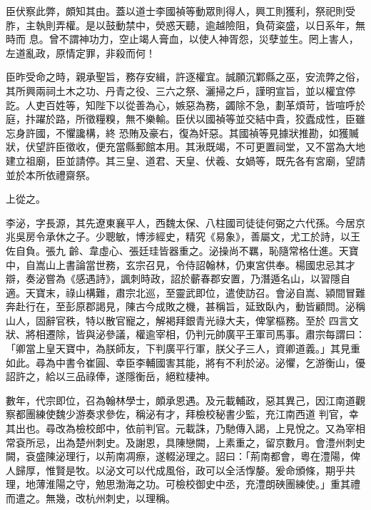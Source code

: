\begin{pinyinscope}
 臣伏察此弊，頗知其由。蓋以道士李國禎等動眾則得人，興工則獲利，祭祀則受胙，主執則弄權。是以鼓動禁中，熒惑天聽，逾越險阻，負荷粢盛，以日系年，無時而
 息。曾不謂神功力，空止竭人膏血，以使人神胥怨，災孽並生。罔上害人，左道亂政，原情定罪，非殺而何！



 臣昨受命之時，親承聖旨，務存安緝，許逐權宜。誠願沉鄴縣之巫，安流弊之俗，其所興兩祠土木之功、丹青之役、三六之祭、灑掃之戶，謹明宣旨，並以權宜停訖。人吏百姓等，知陛下以從善為心，嫉惡為務，蠲除不急，劃革煩苛，皆喧呼於庭，抃躍於路，所徵糧糗，無不樂輸。臣伏以國禎等並交結中貴，狡蠹成性，臣雖忘身許國，不懼讒構，終
 恐賄及豪右，復為奸惡。其國禎等見據狀推勘，如獲贓狀，伏望許臣徵收，便充當縣郵館本用。其湫既竭，不可更置祠堂，又不當為大地建立祖廟，臣並請停。其三皇、道君、天皇、伏羲、女媧等，既先各有宮廟，望請並於本所依禮齋祭。



 上從之。



 李泌，字長源，其先遼東襄平人，西魏太保、八柱國司徒徒何弼之六代孫。今居京兆吳房令承休之子。少聰敏，博涉經史，精究《易象》，善屬文，尤工於詩，以王佐自負。張九
 齡、韋虛心、張廷珪皆器重之。泌操尚不羈，恥隨常格仕進。天寶中，自嵩山上書論當世務，玄宗召見，令侍詔翰林，仍東宮供奉。楊國忠忌其才辯，奏泌嘗為《感遇詩》，諷刺時政，詔於蘄春郡安置，乃潛遁名山，以習隱自適。天寶末，祿山構難，肅宗北巡，至靈武即位，遣使訪召。會泌自嵩、潁間冒難奔赴行在，至彭原郡謁見，陳古今成敗之機，甚稱旨，延致臥內，動皆顧問。泌稱山人，固辭官秩，特以散官寵之，解褐拜銀青光祿大夫，俾掌樞務。至於
 四言文狀、將相遷除，皆與泌參議，權逾宰相，仍判元帥廣平王軍司馬事。肅宗每謂曰：「卿當上皇天寶中，為朕師友，下判廣平行軍，朕父子三人，資卿道義。」其見重如此。尋為中書令崔圓、幸臣李輔國害其能，將有不利於泌。泌懼，乞游衡山，優詔許之，給以三品祿俸，遂隱衡岳，絕粒棲神。



 數年，代宗即位，召為翰林學士，頗承恩遇。及元載輔政，惡其異己，因江南道觀察都團練使魏少游奏求參佐，稱泌有才，拜檢校秘書少監，充江南西道
 判官，幸其出也。尋改為檢校郎中，依前判官。元載誅，乃馳傳入謁，上見悅之。又為宰相常袞所忌，出為楚州刺史。及謝恩，具陳戀闕，上素重之，留京數月。會澧州刺史闕，袞盛陳泌理行，以荊南凋瘵，遂輟泌理之。詔曰：「荊南都會，粵在澧陽，俾人歸厚，惟賢是牧。以泌文可以代成風俗，政可以全活惸嫠。爰命頒條，期乎共理，地薄淮陽之守，勉思渤海之功。可檢校御史中丞，充澧朗硤團練使。」重其禮而遣之。無幾，改杭州刺史，以理稱。




\end{pinyinscope}
